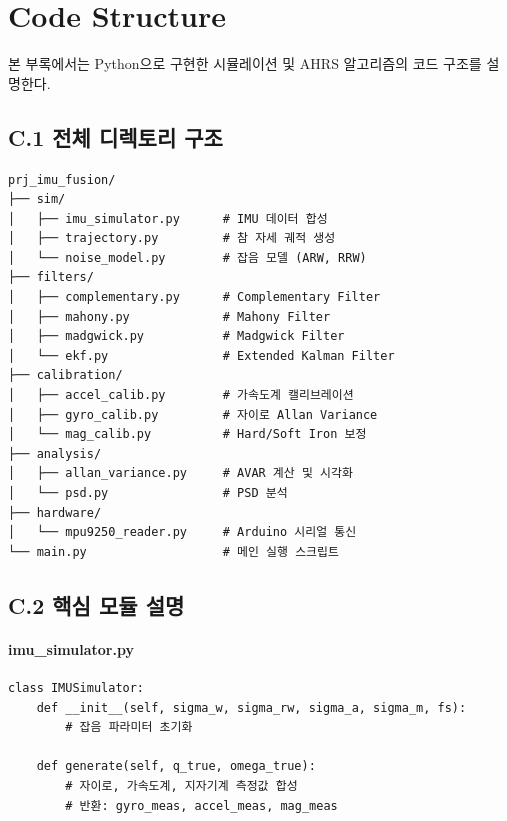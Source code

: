 \section{Code Structure}
\label{app:code}
 
본 부록에서는 Python으로 구현한 시뮬레이션 및 AHRS 알고리즘의
코드 구조를 설명한다.
 
\subsection*{C.1 전체 디렉토리 구조}
 
\begin{verbatim}
prj_imu_fusion/
├── sim/
│   ├── imu_simulator.py      # IMU 데이터 합성
│   ├── trajectory.py         # 참 자세 궤적 생성
│   └── noise_model.py        # 잡음 모델 (ARW, RRW)
├── filters/
│   ├── complementary.py      # Complementary Filter
│   ├── mahony.py             # Mahony Filter
│   ├── madgwick.py           # Madgwick Filter
│   └── ekf.py                # Extended Kalman Filter
├── calibration/
│   ├── accel_calib.py        # 가속도계 캘리브레이션
│   ├── gyro_calib.py         # 자이로 Allan Variance
│   └── mag_calib.py          # Hard/Soft Iron 보정
├── analysis/
│   ├── allan_variance.py     # AVAR 계산 및 시각화
│   └── psd.py                # PSD 분석
├── hardware/
│   └── mpu9250_reader.py     # Arduino 시리얼 통신
└── main.py                   # 메인 실행 스크립트
\end{verbatim}
 
\subsection*{C.2 핵심 모듈 설명}
 
\paragraph{imu\_simulator.py}
 
\begin{verbatim}
class IMUSimulator:
    def __init__(self, sigma_w, sigma_rw, sigma_a, sigma_m, fs):
        # 잡음 파라미터 초기화
    
    def generate(self, q_true, omega_true):
        # 자이로, 가속도계, 지자기계 측정값 합성
        # 반환: gyro_meas, accel_meas, mag_meas
\end{verbatim}
 
